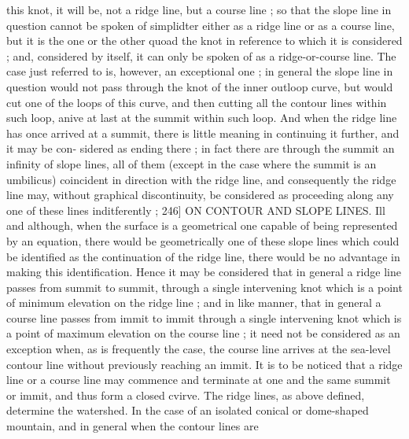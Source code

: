 \documentclass[11pt,a4paper]{book}
\begin{document}
this  knot,  it  will  be,  not  a  ridge  line,  but  a  course  line ;  so  that  the  slope  line  in
question  cannot  be  spoken  of  simplidter  either  as  a  ridge  line  or  as  a  course  line,
but  it  is  the  one  or  the  other  quoad  the  knot  in  reference  to  which  it  is  considered ;
and,  considered  by  itself,  it  can  only  be  spoken  of  as  a  ridge-or-course  line.  The  case
just  referred  to  is,  however,  an  exceptional  one ;  in  general  the  slope  line  in  question
would  not  pass  through  the  knot  of  the  inner  outloop  curve,  but  would  cut  one  of
the  loops  of  this  curve,  and  then  cutting  all  the  contour  lines  within  such  loop,  anive
at  last  at  the  summit  within  such  loop.  And  when  the  ridge  line  has  once  arrived
at  a  summit,  there  is  little  meaning  in  continuing  it  further,  and  it  may  be  con-
sidered as  ending  there ;  in  fact  there  are  through  the  summit  an  infinity  of  slope
lines,  all  of  them  (except  in  the  case  where  the  summit  is  an  umbilicus)  coincident
in  direction  with  the  ridge  line,  and  consequently  the  ridge  line  may,  without  graphical
discontinuity,   be    considered    as   proceeding  along  any   one   of   these    lines  inditferently ;
246]  ON    CONTOUR   AND   SLOPE   LINES.  Ill
and  although,  when  the  surface  is  a  geometrical  one  capable  of  being  represented  by
an  equation,  there  would  be  geometrically  one  of  these  slope  lines  which  could  be
identified  as  the  continuation  of  the  ridge  line,  there  would  be  no  advantage  in  making
this  identification.  Hence  it  may  be  considered  that  in  general  a  ridge  line  passes
from  summit  to  summit,  through  a  single  intervening  knot  which  is  a  point  of
minimum  elevation  on  the  ridge  line ;  and  in  like  manner,  that  in  general  a  course
line  passes  from  immit  to  immit  through  a  single  intervening  knot  which  is  a  point
of  maximum  elevation  on  the  course  line ;  it  need  not  be  considered  as  an  exception
when,  as  is  frequently  the  case,  the  course  line  arrives  at  the  sea-level  contour  line
without  previously  reaching  an  immit.  It  is  to  be  noticed  that  a  ridge  line  or  a
course  line  may  commence  and  terminate  at  one  and  the  same  summit  or  immit,  and
thus  form  a  closed  cvirve.
The  ridge  lines,  as  above  defined,  determine  the  watershed.  In  the  case  of  an
isolated  conical  or  dome-shaped  mountain,  and  in  general  when  the  contour  lines  are
\end{document}

